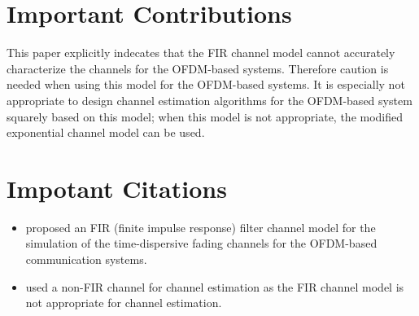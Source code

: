 \documentclass[11pt,draftnofoot,onecolumn]{IEEEtran}
\begin{document}
\section*{Important Contributions}

This paper explicitly indecates that the FIR channel model cannot accurately
characterize the channels for the OFDM-based systems. Therefore
caution is needed when using this model for the OFDM-based systems.
It is especially not appropriate to design channel estimation
algorithms for the OFDM-based system squarely based on this model;
when this model is not appropriate, the modified exponential channel
model can be used.


\section*{Impotant Citations}

\begin{itemize}

\item \cite{Chayat1997} proposed an FIR (finite impulse response)
filter channel model for the simulation of the time-dispersive fading channels for the
OFDM-based communication systems.

\item \cite{LiuLi2004} used a non-FIR channel for channel estimation as the FIR channel model is not appropriate for channel estimation. 

\end{itemize}




\end{document}
